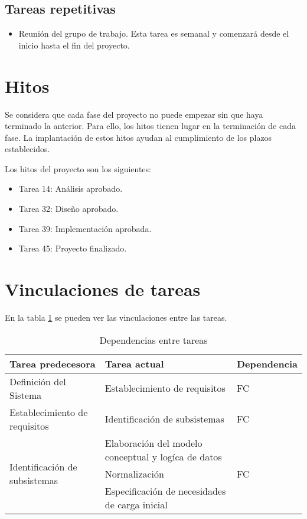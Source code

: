 \documentclass[11pt,a4paper,spanish,twoside]{book}
\begin{document}
\subsection{Tareas repetitivas}
  \begin{itemize}
  \item Reunión del grupo de trabajo. Esta tarea es semanal y comenzará desde
    el inicio hasta el fin del proyecto.
  \end{itemize}
\section{Hitos}
Se considera que cada fase del proyecto no puede empezar sin que haya
terminado la anterior. Para ello, los hitos tienen lugar en la terminación de
cada fase. La implantación de estos hitos ayudan al cumplimiento de los
plazos establecidos.

Los hitos del proyecto son los siguientes:
\begin{itemize}
\item Tarea 14: Análisis aprobado.
\item Tarea 32: Diseño aprobado.
\item Tarea 39: Implementación aprobada.
\item Tarea 45: Proyecto finalizado.
\end{itemize}

\section{Vinculaciones de tareas}
En la tabla \ref{Tab:Dep} se pueden ver las vinculaciones entre las tareas.
\begin{table}[!h]
  \centering
  \small
  \begin{tabular}{l|p{5cm}|l}
    \textbf{Tarea predecesora} & \textbf{Tarea actual} & \textbf{Dependencia}\\
    \hline
    Definición del Sistema & Establecimiento de requisitos & FC \\
    \hline
    Establecimiento de requisitos & Identificación de subsistemas & FC \\
    \hline
    \multirow{3}{*}{Identificación de subsistemas} & Elaboración del modelo 
conceptual y logíca de datos & \multirow{3}{*}{FC} \\
    & Normalización \\
    & Especificación de necesidades de carga inicial \\
    
  \end{tabular}
  \caption{Dependencias entre tareas} \label{Tab:Dep}
\end{table}
\end{document}
